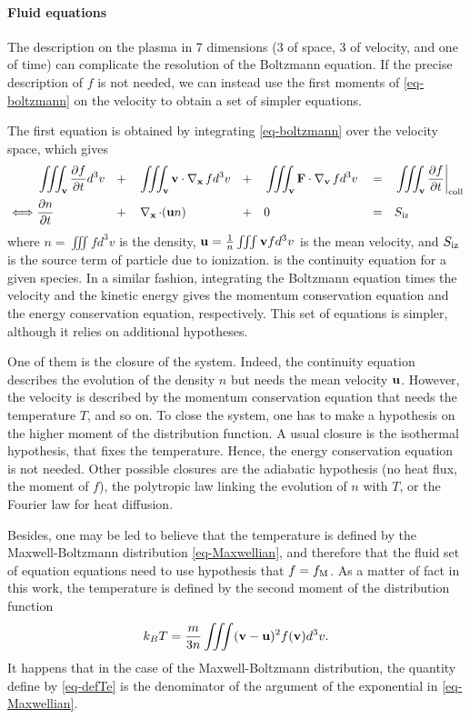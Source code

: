 \paragraph{Fluid equations \\}
The description on the plasma in 7 dimensions (3 of space, 3 of velocity, and one of time) can complicate the resolution of the Boltzmann equation.
If the precise description of $f$ is not needed, we can instead use the first moments of \cref{eq-boltzmann} on the velocity to obtain a set of simpler equations.

The first equation is obtained by integrating \cref{eq-boltzmann} over the velocity space, which gives
\begin{align}
    & \iiint_{{\mathbf v}}  \frac{\partial f}{\partial t} d^3v &&+&& \iiint_{{\mathbf v}}  {\mathbf v} \cdot \operatorname{{\mathbf \nabla}}_{{\mathbf x}} f  d^3v &&+&&  \iiint_{{\mathbf v}}  {\mathbf F} \cdot  \operatorname{{\mathbf \nabla}}_{{\mathbf v}} f  d^3v && = && \iiint_{{\mathbf v}}  \frac{\partial f}{\partial t}  \bigg\vert_{\rm coll}  \nonumber  \\ 
   \iff &  \frac{\partial n}{\partial t} &&+&&  \operatorname{{\mathbf \nabla}}_{{\mathbf x}}  \cdot  ( {\mathbf u} n) &&+&& 0 &&=&& S_{\rm iz}   \label{eq-conc}
\end{align} 
where $n=\iiint f d^3v$ is the density, ${\mathbf u} = \frac{1}{n} \iiint {\mathbf v} f d^3v$ is the mean velocity, and $S_{\rm iz}$ is the source term of particle due to ionization.
 is the continuity equation for a given species.
In a similar fashion, integrating the Boltzmann equation times the velocity and the kinetic energy gives the momentum conservation equation and the energy conservation equation, respectively.
This set of equations is simpler, although it relies on additional hypotheses.

One of them is the closure of the system.
Indeed, the continuity equation describes the evolution of the density $n$ but needs the mean velocity ${\mathbf u}$.
However, the velocity is described by the momentum conservation equation that needs the temperature $T$, and so on.
To close the system, one has to make a hypothesis on the higher moment of the distribution function.
A usual closure is the isothermal hypothesis, that fixes the temperature. 
Hence, the energy conservation equation is not needed.
Other possible closures are the adiabatic hypothesis (no heat flux, the  moment of $f$), the polytropic law linking the evolution of $n$ with $T$, or the Fourier law for heat diffusion.

Besides, one may be led to believe that the temperature is defined by the Maxwell-Boltzmann distribution \cref{eq-Maxwellian}, and therefore that the fluid set of equation equations need to use hypothesis that $f = f_{\rm M}$.
As a matter of fact in this work, the temperature is defined by the second moment of the distribution function
\begin{equation} \label{eq-defTe}
  k_B T = \frac{m}{3 n} \iiint ({\mathbf v} - {\mathbf u})^2 f({\mathbf v}) d^3v.
\end{equation}
It happens that in the case of the Maxwell-Boltzmann distribution, the quantity define by \cref{eq-defTe} is the denominator of the argument of the exponential in \cref{eq-Maxwellian}.

